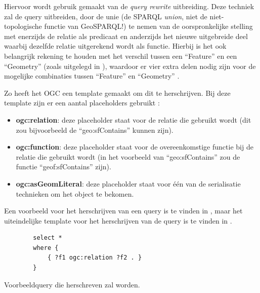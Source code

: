 Hiervoor wordt gebruik gemaakt van de \textit{query rewrite} uitbreiding. Deze techniek zal de query uitbreiden, door de unie (de SPARQL \textit{union}, niet de niet-topologische functie van GeoSPARQL!) te nemen van de oorspronkelijke stelling met enerzijds de relatie als predicaat en anderzijds het nieuwe uitgebreide deel waarbij dezelfde relatie uitgerekend wordt als functie. Hierbij is het ook belangrijk rekening te houden met het verschil tussen een ``Feature'' en een ``Geometry'' (zoals uitgelegd in ), waardoor er vier extra delen nodig zijn voor de mogelijke combinaties tussen ``Feature'' en ``Geometry'' \cite{ogcdocs}. 

Zo heeft het OGC een template gemaakt om dit te herschrijven. Bij deze template zijn er een aantal placeholders gebruikt \cite{ogcdocs}:
\begin{itemize}
    \item \textbf{ogc:relation}: deze placeholder staat voor de relatie die gebruikt wordt (dit zou bijvoorbeeld de ``geo:sfContains'' kunnen zijn).
    \item \textbf{ogc:function}: deze placeholder staat voor de overeenkomstige functie bij de relatie die gebruikt wordt (in het voorbeeld van ``geo:sfContains'' zou de functie ``geof:sfContains'' zijn).
    \item \textbf{ogc:asGeomLiteral}: deze placeholder staat voor één van de serialisatie technieken om het object te bekomen.
\end{itemize}

Een voorbeeld voor het herschrijven van een query is te vinden in , maar het uiteindelijke template voor het herschrijven van de query is te vinden in .

\begin{listing}[ht]
    \begin{verbatim}
        select *
        where {
            { ?f1 ogc:relation ?f2 . }
        }
    \end{verbatim}
    \caption{Voorbeeldquery die herschreven zal worden.}
    \label{listing:geosparql_query_to_rewrite}
\end{listing}

